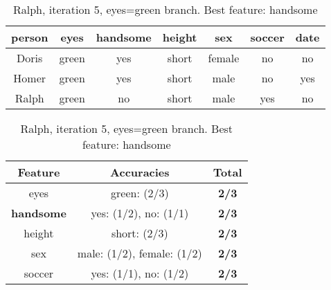 \begin{table}[h!]
  \centering
  \begin{tabular}{cccccc|c}
    \toprule
    person      & eyes  & handsome & height & sex    & soccer & date\\
    \midrule
    Doris       & green & yes      & short  & female & no     & no  \\
    Homer       & green & yes      & short  & male   & no     & yes \\
    Ralph       & green & no       & short  & male   & yes    & no  \\
    \bottomrule
  \end{tabular}

  \vspace{.5cm}

  \begin{tabular}{ccc}
    \toprule
    Feature           & Accuracies                              & Total\\
    \midrule
    eyes              & green: (2/3)                            & \textbf{2/3}\\
    \textbf{handsome} & yes: (1/2), no: (1/1)                   & \textbf{2/3}\\
    height            & short: (2/3)                            & \textbf{2/3}\\
    sex               & male: (1/2), female: (1/2)              & \textbf{2/3}\\
    soccer            & yes: (1/1), no: (1/2)                   & \textbf{2/3}\\
    \bottomrule
  \end{tabular}
  \caption*{Ralph, iteration 5, eyes=green branch. Best feature: handsome}
\end{table}

